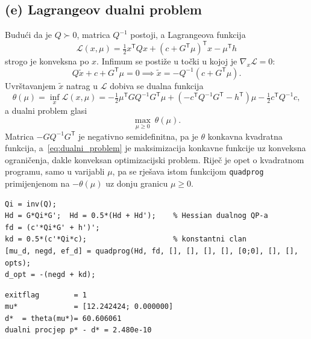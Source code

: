 \subsection{(e) Lagrangeov dualni problem}

Budući da je $Q \succ 0$, matrica $Q^{-1}$ postoji, a Lagrangeova funkcija
\begin{equation}
\mathcal{L}(x, \mu) = \tfrac{1}{2} x^{\mathsf{T}} Q x + (c + G^{\mathsf{T}}\mu)^{\mathsf{T}} x - \mu^{\mathsf{T}} h
\end{equation}
strogo je konveksna po $x$. Infimum se postiže u točki u kojoj je $\nabla_x \mathcal{L} = 0$:
\begin{equation}
Q\tilde{x} + c + G^{\mathsf{T}} \mu = 0 \implies \tilde{x} = -Q^{-1}(c + G^{\mathsf{T}} \mu).
\end{equation}
Uvrštavanjem $\tilde{x}$ natrag u $\mathcal{L}$ dobiva se dualna funkcija
\begin{equation}
\theta(\mu) = \inf_{x} \mathcal{L}(x, \mu)
= -\tfrac{1}{2} \mu^{\mathsf{T}} G Q^{-1} G^{\mathsf{T}} \mu
+ \left( -c^{\mathsf{T}} Q^{-1} G^{\mathsf{T}} - h^{\mathsf{T}} \right) \mu
- \tfrac{1}{2} c^{\mathsf{T}} Q^{-1} c,
\label{eq:dualna_fun}
\end{equation}
a dualni problem glasi
\begin{equation}
\max_{\mu \geq 0} \ \theta(\mu).
\label{eq:dualni_problem}
\end{equation}
Matrica $-G Q^{-1} G^{\mathsf{T}}$ je negativno semidefinitna, pa je $\theta$ konkavna kvadratna funkcija, a~\eqref{eq:dualni_problem} je maksimizacija konkavne funkcije uz konveksna ograničenja, dakle konveksan optimizacijski problem. Riječ je opet o kvadratnom programu, samo u varijabli $\mu$, pa se rješava istom funkcijom \texttt{quadprog} primijenjenom na $-\theta(\mu)$ uz donju granicu $\mu \geq 0$.

\begin{lstlisting}
Qi = inv(Q);
Hd = G*Qi*G';  Hd = 0.5*(Hd + Hd');    % Hessian dualnog QP-a
fd = (c'*Qi*G' + h')';
kd = 0.5*(c'*Qi*c);                    % konstantni clan
[mu_d, negd, ef_d] = quadprog(Hd, fd, [], [], [], [], [0;0], [], [], opts);
d_opt = -(negd + kd);
\end{lstlisting}

\begin{lstlisting}[style=outputstyle]
exitflag        = 1
mu*             = [12.242424; 0.000000]
d*  = theta(mu*)= 60.606061
dualni procjep p* - d* = 2.480e-10
\end{lstlisting}

